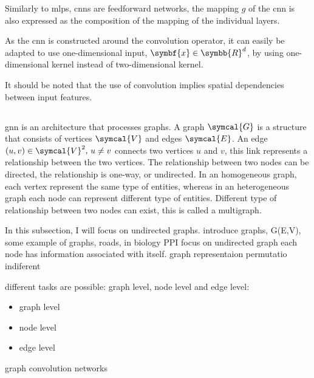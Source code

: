 \documentclass[../main.tex]{subfiles}
\begin{document}
     Similarly to \glspl{mlp}, \glspl{cnn} are feedforward networks, the mapping \(g\) of the \gls{cnn} is also expressed as the composition of the mapping of the individual layers.

     As the \gls{cnn} is constructed around the convolution operator, it can easily be adapted to use one-dimensional input, \(\symbf{x} \in \symbb{R}^d\), by using one-dimensional kernel instead of two-dimensional kernel.

     It should be noted that the use of convolution implies spatial dependencies between input features.

 \subsection{}
     \Gls{gnn} is an architecture that processes graphs.
     A graph \(\symcal{G}\) is a structure that consists of vertices \(\symcal{V}\) and edges \(\symcal{E}\).
     An edge \(\left(u,v\right) \in \symcal{V}^2,\, u\neq v\) connects two vertices \(u\) and \(v\), this link represents a relationship between the two vertices.
     The relationship between two nodes can be directed, the relationship is one-way, or undirected.
     In an homogeneous graph, each vertex represent the same type of entities, whereas in an heterogeneous graph each node can represent different type of entities.
     Different type of relationship between two nodes can exist, this is called a multigraph.



     In this subsection, I will focus on undirected graphs.
     introduce graphs, G(E,V), some example of graphs, roads, in biology PPI
     focus on undirected graph
     each node has information associated with itself.
     graph representaion
     permutatio indiferent

     different tasks are possible: graph level, node level and edge level:
     \begin{itemize}
         \item graph level
         \item node level
         \item edge level
     \end{itemize}

     graph convolution networks
\end{document}
